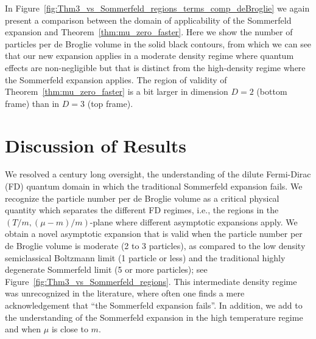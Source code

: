 \documentclass[sn-mathphys,Numbered]{sn-jnl}
\newcommand{\rf}[1]{Figure~{\ref{#1}}}
\newcommand{\rTh}[1]{Theorem~{\ref{#1}}}
\begin{document}
In  \rf{fig:Thm3_vs_Sommerfeld_regions_terms_comp_deBroglie} we again present a comparison between the  domain of applicability of the Sommerfeld expansion and  \rTh{thm:mu_zero_faster}. Here we   show the number of particles per de Broglie volume in the solid black contours, from which we can see that our new expansion applies in a moderate density regime where quantum effects are non-negligible but that is distinct from the high-density regime where the Sommerfeld expansion applies.  The region of validity of \rTh{thm:mu_zero_faster} is a bit larger in dimension $D=2$ (bottom frame) than in $D=3$ (top frame).





\section{Discussion of Results}
\label{sec:final}
We resolved a century long oversight, the understanding of the dilute Fermi-Dirac (FD) quantum  domain in which the traditional Sommerfeld expansion fails. We recognize the particle number per de Broglie volume as a  critical physical quantity which  separates the different FD regimes, i.e., the regions in the $(T/m,(\mu-m)/m)$-plane where different asymptotic expansions apply. We obtain a novel asymptotic expansion that is valid   when the particle number per de Broglie volume is moderate (2 to 3 particles), as compared to the low density  semiclassical Boltzmann limit (1 particle or less) and the traditional highly degenerate Sommerfeld limit (5 or more particles); see \rf{fig:Thm3_vs_Sommerfeld_regions}. This intermediate density regime was unrecognized in the literature, where often one finds a mere acknowledgement that ``the Sommerfeld expansion fails''. In addition, we add to the understanding of the Sommerfeld expansion in the high temperature regime and when $\mu$ is close to $m$.
\end{document}
